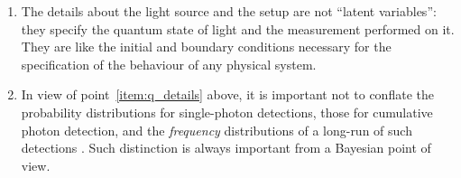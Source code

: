 \documentclass[\ifafour a4paper,12pt,\else a5paper,10pt,\fi%
onecolumn,oneside,article,%
british%
]{memoir}
\newcommand*{\defquote}[1]{`\,#1\,'}
\theoremstyle{remark}
\theoremstyle{innote}
\newcommand*{\citep}{\parencites}%
\newcommand*{\amp}{\&}
\renewcommand*{\|}[1][]{\nonscript\,#1\vert\nonscript\;\mathopen{}}
\newcommand*{\sect}{\S}%
\newcommand*{\eqn}{eq.}%
\begin{document}
\begin{enumerate}[label=(\textbf{\roman*})]
\item\label{item:latent_vars} The details about the light source and the
  setup are not \enquote{latent variables}: they specify the quantum state
  of light and the measurement performed on it. They are like the initial
  and boundary conditions necessary for the specification of the behaviour
  of any physical system. %

\item\label{item:q_prob_freq} In view of point~\ref{item:q_details} above,
  it is important not to conflate the probability distributions for
  single-photon detections, those for cumulative photon detection, and the
  \emph{frequency} distributions of a long-run of such detections
  \citep[\sect~2, seem to conflate the two]{gelmanetal2020}. Such
  distinction is always important from a Bayesian point of view.
%  



\end{enumerate}
\end{document}

